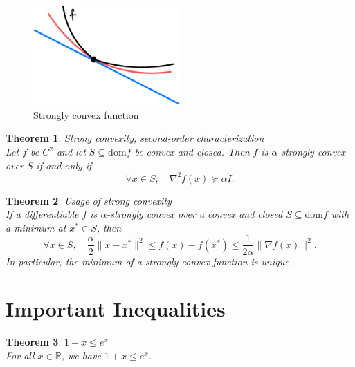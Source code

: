\documentclass[11pt]{book} %
\newtheorem{theorem}{Theorem}[section]
\begin{document}
\begin{figure}[H]
    \centering
    \includegraphics[width=0.5\textwidth]{Figs/strongly_convex.png}
    \caption{Strongly convex function}
\end{figure}

\begin{theorem} { Strong convexity, second-order characterization}\\
Let \( f \) be \( C^2 \) and let \( S \subseteq \text{dom} f \) be convex and closed. Then \( f \) is \(\alpha\)-strongly convex over \( S \) if and only if
\[
\forall x \in S, \quad \nabla^2 f(x) \succeq \alpha I.
\]
\end{theorem}


\begin{theorem} {Usage of strong convexity } \\
If a differentiable \( f \) is \(\alpha\)-strongly convex over a convex and closed \( S \subseteq \text{dom} f \) with a minimum at \( x^* \in S \), then
\[
\forall x \in S, \quad \frac{\alpha}{2} \|x - x^*\|^2 \leq f(x) - f(x^*) \leq \frac{1}{2\alpha} \|\nabla f(x)\|^2.
\]
In particular, the minimum of a strongly convex function is unique.
\end{theorem}




\section{Important Inequalities}

\begin{theorem}{$1 + x \leq e^x$} \\
For all $x \in \mathbb{R}$, we have $1 + x \leq e^x$.    
\end{theorem}
\end{document}
